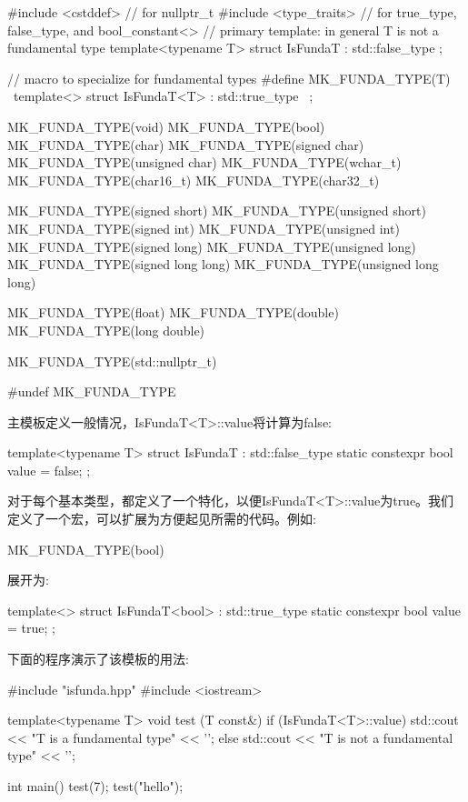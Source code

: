 \begin{cpp}
#include <cstddef> // for nullptr_t
#include <type_traits> // for true_type, false_type, and
 bool_constant<>
// primary template: in general T is not a fundamental type
template<typename T>
struct IsFundaT : std::false_type {
};

// macro to specialize for fundamental types
#define MK_FUNDA_TYPE(T) \
template<> struct IsFundaT<T> : std::true_type { \
};

MK_FUNDA_TYPE(void)
MK_FUNDA_TYPE(bool)
MK_FUNDA_TYPE(char)
MK_FUNDA_TYPE(signed char)
MK_FUNDA_TYPE(unsigned char)
MK_FUNDA_TYPE(wchar_t)
MK_FUNDA_TYPE(char16_t)
MK_FUNDA_TYPE(char32_t)

MK_FUNDA_TYPE(signed short)
MK_FUNDA_TYPE(unsigned short)
MK_FUNDA_TYPE(signed int)
MK_FUNDA_TYPE(unsigned int)
MK_FUNDA_TYPE(signed long)
MK_FUNDA_TYPE(unsigned long)
MK_FUNDA_TYPE(signed long long)
MK_FUNDA_TYPE(unsigned long long)

MK_FUNDA_TYPE(float)
MK_FUNDA_TYPE(double)
MK_FUNDA_TYPE(long double)

MK_FUNDA_TYPE(std::nullptr_t)

#undef MK_FUNDA_TYPE
\end{cpp}

主模板定义一般情况，IsFundaT<T>::value将计算为false:

\begin{cpp}
template<typename T>
struct IsFundaT : std::false_type {
	static constexpr bool value = false;
};
\end{cpp}

对于每个基本类型，都定义了一个特化，以便IsFundaT<T>::value为true。我们定义了一个宏，可以扩展为方便起见所需的代码。例如:

\begin{cpp}
MK_FUNDA_TYPE(bool)
\end{cpp}

展开为:

\begin{cpp}
template<> struct IsFundaT<bool> : std::true_type {
	static constexpr bool value = true;
};
\end{cpp}

下面的程序演示了该模板的用法:

\begin{cpp}
#include "isfunda.hpp"
#include <iostream>

template<typename T>
void test (T const&)
{
	if (IsFundaT<T>::value) {
		std::cout << "T is a fundamental type" << '\n';
	}
	else {
		std::cout << "T is not a fundamental type" << '\n';
	}
}

int main()
{
	test(7);
	test("hello");
}
\end{cpp}

